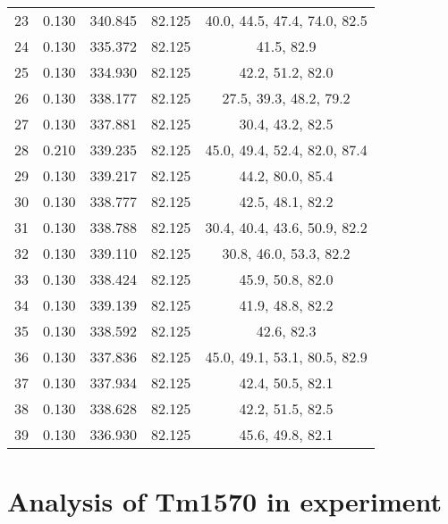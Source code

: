 \begin{table}
\begin{tabular}{c|c|c|c|c}
        23 & 0.130 & 340.845 & 82.125 & 40.0, 44.5, 47.4, 74.0, 82.5\\
        24 & 0.130 & 335.372 & 82.125 & 41.5, 82.9\\
        25 & 0.130 & 334.930 & 82.125 & 42.2, 51.2, 82.0\\
        26 & 0.130 & 338.177 & 82.125 & 27.5, 39.3, 48.2, 79.2\\
        27 & 0.130 & 337.881 & 82.125 & 30.4, 43.2, 82.5\\
        28 & 0.210 & 339.235 & 82.125 & 45.0, 49.4, 52.4, 82.0, 87.4\\
        29 & 0.130 & 339.217 & 82.125 & 44.2, 80.0, 85.4\\
        30 & 0.130 & 338.777 & 82.125 & 42.5, 48.1, 82.2\\
        31 & 0.130 & 338.788 & 82.125 & 30.4, 40.4, 43.6, 50.9, 82.2\\
        32 & 0.130 & 339.110 & 82.125 & 30.8, 46.0, 53.3, 82.2\\
        33 & 0.130 & 338.424 & 82.125 & 45.9, 50.8, 82.0\\
        34 & 0.130 & 339.139 & 82.125 & 41.9, 48.8, 82.2\\
        35 & 0.130 & 338.592 & 82.125 & 42.6, 82.3\\
        36 & 0.130 & 337.836 & 82.125 & 45.0, 49.1, 53.1, 80.5, 82.9\\
        37 & 0.130 & 337.934 & 82.125 & 42.4, 50.5, 82.1\\
        38 & 0.130 & 338.628 & 82.125 & 42.2, 51.5, 82.5\\
        39 & 0.130 & 336.930 & 82.125 & 45.6, 49.8, 82.1\\
    \end{tabular}
\end{table}

\section{Analysis of Tm1570 in experiment}
\label{sec:fit-details-tm1570-experiment}

